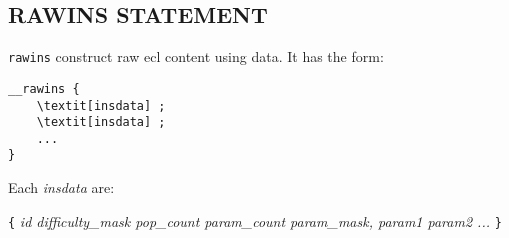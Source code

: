 \documentclass{article}
\begin{document}
\subsection{RAWINS STATEMENT}

\verb|rawins| construct raw ecl content using data. It has the form:

\begin{Verbatim}[frame=single, rulecolor=\color{magenta}, commandchars=\\\[\]]
__rawins {
	\textit[insdata] ;
	\textit[insdata] ;
	...
}
\end{Verbatim}

Each \textit{insdata} are:

\verb|{| \textit{id difficulty\_mask pop\_count param\_count param\_mask, param1 param2 ...} \verb|}|
\end{document}

